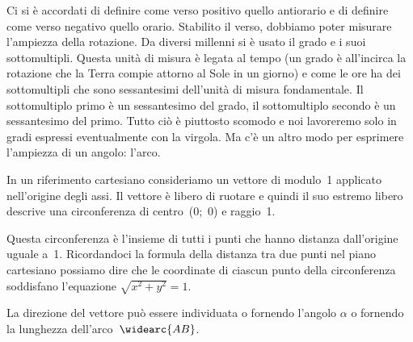 \begin{wrapfigure}{l}{0.5\textwidth} 
 \vspace{-6pt}
  \begin{minipage}{.3\textwidth}
  \begin{center}
\begin{inaccessibleblock}
    
\end{inaccessibleblock}
  \end{center}
  \end{minipage}
   \vspace{-12pt}
  \vspace{1pt}
\end{wrapfigure} 
 
Ci si è accordati di definire come verso positivo quello antiorario e di 
definire come verso negativo quello orario.
Stabilito il verso, dobbiamo poter misurare l'ampiezza della rotazione. 
Da diversi millenni si è usato il grado e i suoi sottomultipli. 
Questa unità di misura è legata al tempo (un grado è all'incirca la rotazione 
che la Terra compie attorno al Sole in un giorno) e come le ore ha dei 
sottomultipli che sono sessantesimi dell'unità di misura fondamentale. 
Il sottomultiplo primo è un sessantesimo del grado, il sottomultiplo secondo 
è un sessantesimo del primo. 
Tutto ciò è piuttosto scomodo e noi lavoreremo solo in gradi espressi 
eventualmente con la virgola. Ma c'è un altro modo per esprimere l'ampiezza 
di un angolo: l'arco. 

In un riferimento cartesiano consideriamo un vettore di modulo~1 applicato
nell'origine degli assi. 
Il vettore è libero di ruotare e quindi il suo estremo 
libero descrive una circonferenza di centro~(0;~0) e raggio~1. 

Questa circonferenza è l'insieme di tutti i punti che hanno distanza 
dall'origine uguale a~1. Ricordandoci la formula della distanza tra due punti
nel piano cartesiano possiamo dire che le coordinate di ciascun punto della 
circonferenza soddisfano l'equazione \(\sqrt{x^2 + y^2} = 1\).

La direzione del vettore può essere individuata o fornendo l'angolo 
\(\alpha\) 
o fornendo la lunghezza dell'arco~\(\widearc{AB}\).

